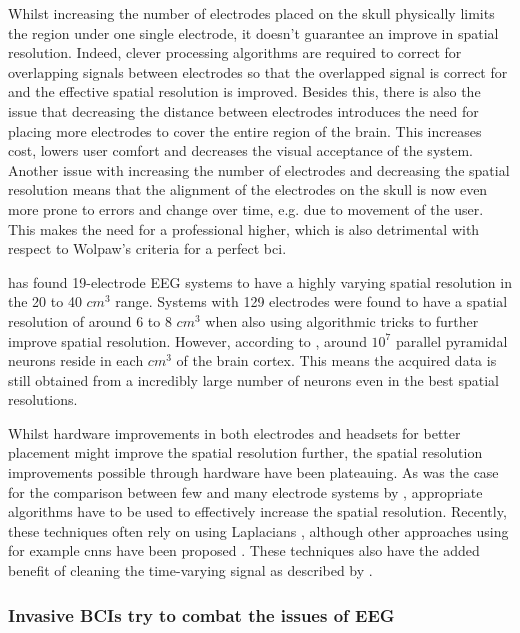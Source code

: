 Whilst increasing the number of electrodes placed on the skull physically limits the region under one single electrode, it doesn't guarantee an improve in spatial resolution.
Indeed, clever processing algorithms are required to correct for overlapping signals between electrodes so that the overlapped signal is correct for and the effective spatial resolution is improved.
Besides this, there is also the issue that decreasing the distance between electrodes introduces the need for placing more electrodes to cover the entire region of the brain.
This increases cost, lowers user comfort and decreases the visual acceptance of the system.
Another issue with increasing the number of electrodes and decreasing the spatial resolution means that the alignment of the electrodes on the skull is now even more prone to errors and change over time, e.g. due to movement of the user.
This makes the need for a professional higher, which is also detrimental with respect to Wolpaw's criteria for a perfect \gls{bci}.

 has found 19-electrode EEG systems to have a highly varying spatial resolution in the 20 to 40 $cm^3$ range.
Systems with 129 electrodes were found to have a spatial resolution of around 6 to 8 $cm^3$ \citep{spatial_resolution} when also using algorithmic tricks to further improve spatial resolution.
However, according to \citet{neurons_book}, around $10^7$ parallel pyramidal neurons reside in each $cm^3$ of the brain cortex.
This means the acquired data is still obtained from a incredibly large number of neurons even in the best spatial resolutions.

Whilst hardware improvements in both electrodes and headsets for better placement might improve the spatial resolution further, the spatial resolution improvements possible through hardware have been plateauing.
As was the case for the comparison between few and many electrode systems by \citet{spatial_resolution}, appropriate algorithms have to be used to effectively increase the spatial resolution.
Recently, these techniques often rely on using Laplacians \citep{improve_eeg_spatial_laplacian1, improve_eeg_spatial_laplacian2, improve_eeg_spatial_laplacian3}, although other approaches using for example \glspl{cnn} have been proposed \citep{improve_eeg_spatial_cnn}.
These techniques also have the added benefit of cleaning the time-varying signal as described by \citet{improve_eeg_spatial_comparison}.


\subsubsection{Invasive BCIs try to combat the issues of EEG}
\label{subsubsec:bci_gaining_popularity_better_measuring_invasive}

